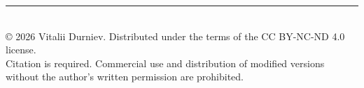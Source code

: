 \documentclass[aps,prd,onecolumn,nofootinbib,superscriptaddress]{revtex4-2}
\begin{document}
\vfill
\begin{center}
    \rule{0.5\textwidth}{.4pt} \\
    \vspace{2mm}
    \footnotesize
    © 2026 Vitalii Durniev. Distributed under the terms of the CC BY-NC-ND 4.0 license. \\
    Citation is required. Commercial use and distribution of modified versions without the author's written permission are prohibited.
\end{center}
\end{document}

